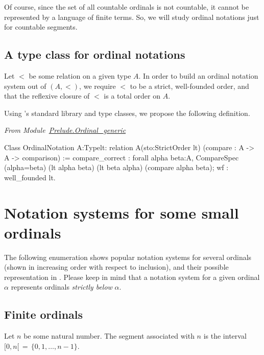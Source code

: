Of course, since the set of all countable ordinals is not countable, it cannot be represented by a language of finite terms. So, we will study ordinal notations just  for countable segments.

\subsection{A type class for ordinal notations}

Let $<$ be some relation on a given type $A$. In order to build an ordinal  notation 
system out of $(A,<)$, we require $<$ to be a strict, well-founded order, and that 
the reflexive closure of $<$ is a total order on $A$.


Using \coq's standard library and type classes, we propose the following definition.

\vspace{4pt}
\noindent\emph{From Module~\href{../src/html/hydras.Prelude.Ordinal_generic.html}{Prelude.Ordinal\_generic}}

\begin{Coqsrc}
Class OrdinalNotation {A:Type}{lt: relation A}(sto:StrictOrder lt)
      (compare : A -> A -> comparison) :=
  { compare_correct :
      forall alpha beta:A,
        CompareSpec (alpha=beta) (lt alpha beta) (lt beta alpha)
                                 (compare alpha beta);
    wf : well_founded lt}.  
\end{Coqsrc}






\section{Notation systems for some small ordinals}

The following enumeration  shows  popular notation systems for several ordinals (shown in increasing order with respect to inclusion), and their possible representation in \coq{}.
Please keep in mind that a notation system for a given ordinal $\alpha$ represents 
ordinals \emph{strictly below} $\alpha$.

\subsection{Finite ordinals}
Let $n$ be some natural number. The segment associated with $n$ is the interval 
$[0,n[\,=\,\{0,1,\dots,n-1\}$. 

